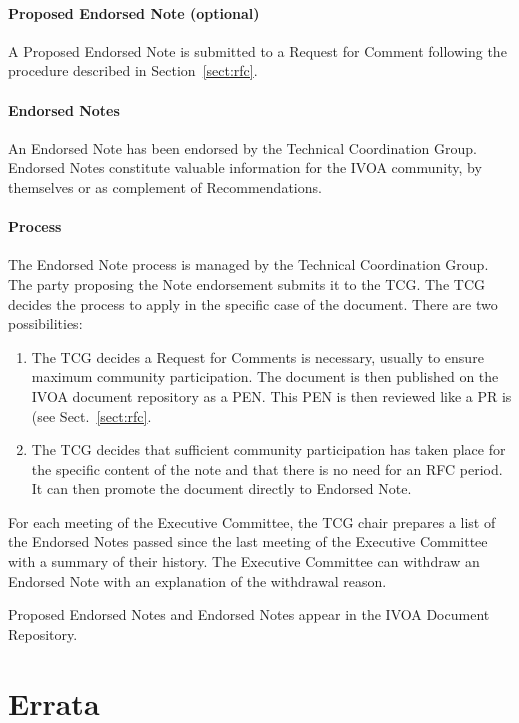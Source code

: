 \documentclass[11pt,a4paper]{ivoa}
\begin{document}
\paragraph{Proposed  Endorsed  Note  (optional)}  A  Proposed  Endorsed  Note  is
submitted  to  a Request for Comment following the procedure described
in Section~\ref{sect:rfc}.

\paragraph{Endorsed Notes} An Endorsed Note has been endorsed by the Technical
Coordination Group.  Endorsed  Notes  constitute  valuable  information
for  the  IVOA  community,  by themselves or as complement of
Recommendations.

\paragraph{Process} The Endorsed Note process is managed by the Technical
Coordination Group.  The party proposing the Note endorsement submits it
to the TCG. The TCG decides the process to apply in the specific case of
the document. There are two possibilities:

\begin{enumerate}
\item The  TCG  decides  a  Request  for  Comments  is necessary,
usually to ensure maximum community participation.  The document is then
published on the IVOA document repository as a PEN.  This PEN is then
reviewed like a PR is (see Sect.~\ref{sect:rfc}.

\item The  TCG  decides  that  sufficient community participation has
taken place for the specific content of the note and that there  is  no
need  for an RFC period.  It can then promote the document directly to
Endorsed Note.
\end{enumerate}

For  each  meeting  of  the  Executive  Committee,  the  TCG  chair
prepares  a  list  of  the Endorsed  Notes  passed  since  the  last
meeting  of  the  Executive  Committee  with  a summary of their
history. The Executive Committee can withdraw an Endorsed Note with an
explanation of the withdrawal reason.

Proposed  Endorsed  Notes  and  Endorsed  Notes  appear  in  the  IVOA
Document Repository.

\section{Errata}
\label{sect:errata}
\end{document}
